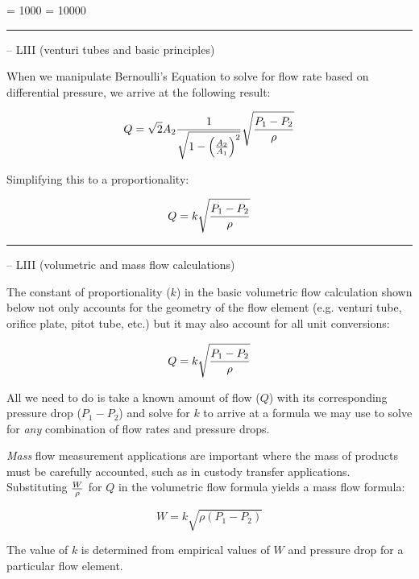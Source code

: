 



\tolerance = 1000
\pretolerance = 10000

\vskip 5pt \hrule \vskip 5pt  -- LIII (venturi tubes and basic principles) \vskip 10pt

When we manipulate Bernoulli's Equation to solve for flow rate based on differential pressure, we arrive at the following result:

$$Q = \sqrt{2} A_2 {1 \over \sqrt{1 - \left({A_2 \over A_1}\right)^2}} \sqrt{{P_1 - P_2} \over \rho}$$

Simplifying this to a proportionality:

$$Q = k \sqrt{{P_1 - P_2} \over \rho}$$


\filbreak \vskip 5pt \hrule \vskip 5pt  -- LIII (volumetric and mass flow calculations) \vskip 10pt

The constant of proportionality ($k$) in the basic volumetric flow calculation shown below not only accounts for the geometry of the flow element (e.g. venturi tube, orifice plate, pitot tube, etc.) but it may also account for all unit conversions:

$$Q = k \sqrt{{P_1 - P_2} \over \rho}$$

All we need to do is take a known amount of flow ($Q$) with its corresponding pressure drop ($P_1 - P_2$) and solve for $k$ to arrive at a formula we may use to solve for {\it any} combination of flow rates and pressure drops.

\vskip 10pt

{\it Mass} flow measurement applications are important where the mass of products must be carefully accounted, such as in custody transfer applications.  Substituting $W \over \rho$ for $Q$ in the volumetric flow formula yields a mass flow formula:

$$W = k \sqrt{\rho ({P_1 - P_2})}$$

The value of $k$ is determined from empirical values of $W$ and pressure drop for a particular flow element.






